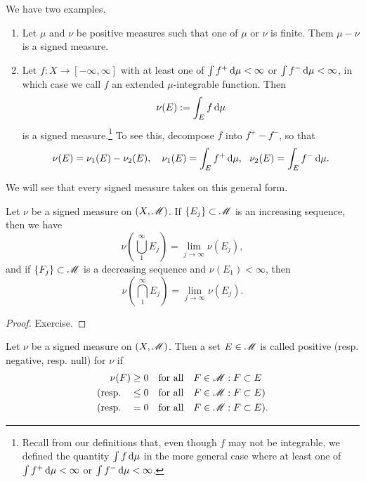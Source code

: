 \documentclass[12pt]{article} %
\begin{document}
\begin{example}
    We have two examples.
    \begin{enumerate}
        \item Let $\mu$ and $\nu$ be positive measures such that one of $\mu$ or $\nu$ is finite. Them $\mu - \nu$ is a signed measure.
        \item Let $f : X \to [-\infty,\infty]$ with at least one of $\int f^+ \, \mathrm{d} \mu < \infty$ or $\int f^- \, \mathrm{d} \mu < \infty$, in which case we call $f$ an extended $\mu$-integrable function. Then \[\nu(E) := \int_E f \, \mathrm{d} \mu\] is a signed measure.\footnote{Recall from our definitions that, even though $f$ may not be integrable, we defined the quantity $\int f \, \mathrm{d}\mu$ in the more general case where at least one of $\int f^+ \, \mathrm{d} \mu < \infty$ or $\int f^- \, \mathrm{d} \mu < \infty$.} To see this, decompose $f$ into $f^+ - f^-$, so that \[\nu(E) = \nu_1(E) - \nu_2(E), \ \ \ \nu_1(E) = \int_E f^+\d\mu, \ \ \nu_2(E) = \int_E f^- \d \mu.\]
    \end{enumerate}
    We will see that every signed measure takes on this general form.
\end{example}

\begin{proposition}
    Let $\nu$ be a signed measure on $(X, \mathscr{M})$. If $\{E_j\} \subset \mathscr{M}$ is an increasing sequence, then we have \[\nu\left(\bigcup_1^\infty E_j \right) = \lim_{j \to \infty} \nu(E_j),\] and if $\{F_j\} \subset \mathscr{M}$ is a decreasing sequence and $\nu(E_1) < \infty$, then \[\nu\left(\bigcap_1^\infty E_j \right) = \lim_{j \to \infty} \nu(E_j).\]
\end{proposition}

\begin{proof}
    Exercise.
\end{proof}

\begin{definition}
    Let $\nu$ be a signed measure on $(X, \mathscr{M})$. Then a set $E \in \mathscr{M}$ is called positive (resp. negative, resp. null) for $\nu$ if \begin{align*}
        \nu(F) &\geq 0 \ \ \ \text{for all} \ \ \ F \in \mathscr{M} : F \subset E\\
        \text{(resp.} \ \ \ &\leq 0 \ \ \ \text{for all} \ \ \ F \in \mathscr{M} : F \subset E \text{)}\\
        \text{(resp.} \ \ \ &= 0 \ \ \ \text{for all} \ \ \ F \in \mathscr{M} : F \subset E \text{)}.
    \end{align*}
\end{definition}
\end{document}
